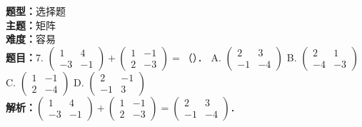 \documentclass{ctexart}
\newenvironment{question}[5]{%
	\noindent\textbf{题型：}#1\\
	\textbf{主题：}#2\\
	\textbf{难度：}#3\\
	\textbf{题目：}#4\\
	\textbf{解析：}#5\\
	\vspace{1em}
}{}
\begin{document}
	\begin{question}
		{选择题}
		{矩阵}
		{容易}
		{7. \(\left(\begin{array}{cc}1 & 4 \\ -3 & -1\end{array}\right)+\left(\begin{array}{cc}1 & -1 \\ 2 & -3\end{array}\right)=\)（）．
			A. \(\left(\begin{array}{cc}2 & 3 \\ -1 & -4\end{array}\right)\)
			B. \(\left(\begin{array}{cc}2 & 1 \\ -4 & -3\end{array}\right)\)
			C. \(\left(\begin{array}{ll}1 & -1 \\ 2 & -4\end{array}\right)\)
			D. \(\left(\begin{array}{cc}2 & -1 \\ -1 & 3\end{array}\right)\)}
		{\(\left(\begin{array}{cc}1 & 4 \\ -3 & -1\end{array}\right)+\left(\begin{array}{cc}1 & -1 \\ 2 & -3\end{array}\right)=\left(\begin{array}{cc}2 & 3 \\ -1 & -4\end{array}\right)\)．}
	\end{question}
	
\end{document}
